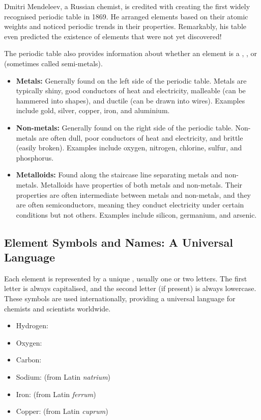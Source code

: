 \begin{marginnote}
  Dmitri Mendeleev, a Russian chemist, is credited with creating the first widely recognised periodic table in 1869.  He arranged elements based on their atomic weights and noticed periodic trends in their properties.  Remarkably, his table even predicted the existence of elements that were not yet discovered!
\end{marginnote}

The periodic table also provides information about whether an element is a , , or  (sometimes called semi-metals).

\begin{itemize}
    \item \textbf{Metals:}  Generally found on the left side of the periodic table. Metals are typically shiny, good conductors of heat and electricity, malleable (can be hammered into shapes), and ductile (can be drawn into wires). Examples include gold, silver, copper, iron, and aluminium.
    \item \textbf{Non-metals:}  Generally found on the right side of the periodic table. Non-metals are often dull, poor conductors of heat and electricity, and brittle (easily broken). Examples include oxygen, nitrogen, chlorine, sulfur, and phosphorus.
    \item \textbf{Metalloids:}  Found along the staircase line separating metals and non-metals. Metalloids have properties of both metals and non-metals.  Their properties are often intermediate between metals and non-metals, and they are often semiconductors, meaning they conduct electricity under certain conditions but not others.  Examples include silicon, germanium, and arsenic.
\end{itemize}

\subsection{Element Symbols and Names: A Universal Language}

Each element is represented by a unique , usually one or two letters. The first letter is always capitalised, and the second letter (if present) is always lowercase.  These symbols are used internationally, providing a universal language for chemists and scientists worldwide.

\begin{example}
\begin{itemize}
    \item Hydrogen: 
    \item Oxygen: 
    \item Carbon: 
    \item Sodium:  (from Latin \textit{natrium})
    \item Iron:  (from Latin \textit{ferrum})
    \item Copper:  (from Latin \textit{cuprum})
\end{itemize}
\end{example}

